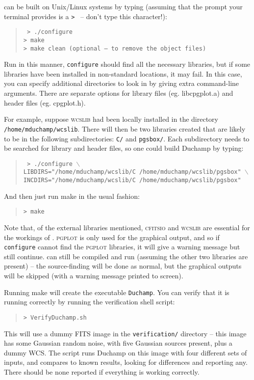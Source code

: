 \duchamp can be built on Unix/Linux systems by typing (assuming that
the prompt your terminal provides is a \texttt{> } -- don't type this
character!):
\begin{quote}
{\footnotesize
\texttt{%
> ./configure\\
> make\\
> make clean (optional -- to remove the object files)}
}
\end{quote}

Run in this manner, \texttt{configure} should find all the necessary
libraries, but if some libraries have been installed in non-standard
locations, it may fail. In this case, you can specify additional
directories to look in by giving extra command-line arguments. There
are separate options for library files (eg. libcpgplot.a) and header
files (eg. cpgplot.h).

For example, suppose \textsc{wcslib} had been locally installed in the
directory \texttt{/home/mduchamp/wcslib}. There will then be two
libraries created that are likely to be in the following
subdirectories: \texttt{C/} and \texttt{pgsbox/}. Each subdirectory
needs to be searched for library and header files, so one could build
Duchamp by typing:
\begin{quote}
{\footnotesize
\texttt{%
>  ./configure $\backslash$ \\ 
LIBDIRS="/home/mduchamp/wcslib/C /home/mduchamp/wcslib/pgsbox" 
$\backslash$\\
INCDIRS="/home/mduchamp/wcslib/C /home/mduchamp/wcslib/pgsbox"}
}
\end{quote}
And then just run make in the usual fashion:
\begin{quote}
{\footnotesize
\texttt{> make}
}
\end{quote}

Note that, of the external libraries mentioned, \textsc{cfitsio} and
\textsc{wcslib} are essential for the workings of
\duchamp. \textsc{pgplot} is only used for the graphical output, and
so if \texttt{configure} cannot find the \textsc{pgplot} libraries, it
will give a warning message but still continue. \duchamp can still be
compiled and run (assuming the other two libraries are present) -- the
source-finding will be done as normal, but the graphical outputs will
be skipped (with a warning message printed to screen).

Running make will create the executable \texttt{Duchamp}. You can
verify that it is running correctly by running the verification shell
script:
\begin{quote}
{\footnotesize
\texttt{> VerifyDuchamp.sh}
}
\end{quote}
This will use a dummy FITS image in the \texttt{verification/}
directory -- this image has some Gaussian random noise, with five
Gaussian sources present, plus a dummy WCS. The script runs
Duchamp on this image with four different sets of inputs, and
compares to known results, looking for differences and reporting
any. There should be none reported if everything is working correctly.

